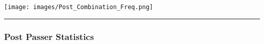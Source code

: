 \documentclass[a4paper,12pt]{article}
\begin{document}
\begin{table}[H]
{\begin{minipage}[t]{0.6\textwidth}
{\begin{tabular}
            
                
            
                
            


            \bottomrule
        \end{tabular}
        } %
    \end{minipage}
    } %
    \hfill %
    \begin{minipage}[c]{0.35\textwidth} %
        \flushright
        \texttt{[image: images/Post\_Combination\_Freq.png]} %
    \end{minipage}
\end{table}

\vspace{0em} %
\hrule height 1pt width 1\textwidth %
\vspace{1em} %

\subsubsection{Post Passer Statistics}

\vspace{-1em} %
\end{document}
